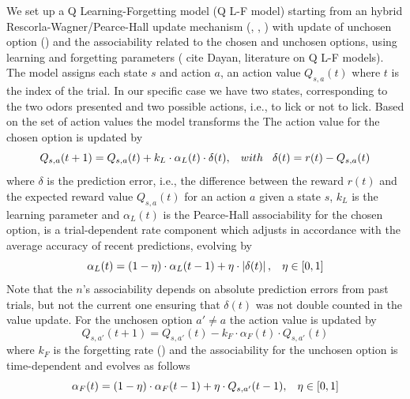 We set up a Q Learning-Forgetting model (Q L-F model) starting from an hybrid Rescorla-Wagner/Pearce-Hall update mechanism (\cite{Koppe}, \cite{Costa}, \cite{Li}) with update of unchosen option (\cite{Katahira}) and the associability related to the chosen and unchosen options, using learning and forgetting parameters ({\color{red} cite Dayan, literature on Q L-F models}).
The model assigns each state $s$ and action $a$, an action value $Q_{s,a}(t)$ where $t$ is the index of the trial. In our specific case we have two states, corresponding to the two odors presented and two possible actions, i.e., to lick or not to lick. 
Based on the set of action values the model transforms the The action value for the chosen option is updated by
\begin{equation}
Q_{s,a}(t+1)  = Q_{s,a}(t)+k_L\cdot\alpha_L(t)\cdot\delta(t), \hspace{0.3cm} with \hspace{0.3cm}\delta(t)=r(t)-Q_{s,a}(t)
\label{eq:Qlearning}
\end{equation}
where $\delta$ is the prediction error, i.e., the difference between the reward $r(t)$ and the expected reward value $Q_{s,a}(t)$ for an action $a$ given a state $s$, $k_L$ is the learning parameter and $\alpha_L(t)$ is the Pearce-Hall associability for the chosen option, is a trial-dependent rate component which adjusts in accordance with the average accuracy of recent predictions, evolving by
\begin{equation}
   \alpha_L(t)=(1-\eta)\cdot\alpha_L(t-1)+\eta\cdot\left\lvert\delta(t)\right\rvert,\hspace{0.3cm} \eta\in[0,1]
    \label{eq:Alphalearning}
\end{equation}
Note that the $n$'s associability depends on absolute prediction errors from past trials, but not the current one ensuring that $\delta(t)$ was not double counted in the value update. 
For the unchosen option $a'\neq a$ the action value is updated by
\begin{equation}
    Q_{s,a'}(t+1) = Q_{s,a'}(t)-k_F\cdot\alpha_F(t)\cdot Q_{s,a'}(t)
    \label{eq:Qforgetting}
\end{equation}
where $k_F$ is the forgetting rate (\cite{ItoDoya}) and the associability for the unchosen option is time-dependent and evolves as follows
\begin{equation}
    \alpha_F(t)=(1-\eta)\cdot\alpha_F(t-1)+\eta\cdot Q_{s,a'}(t-1), \hspace{0.3cm}
    \eta\in[0,1]
    \label{eq:Alphaforgetting}
\end{equation}
